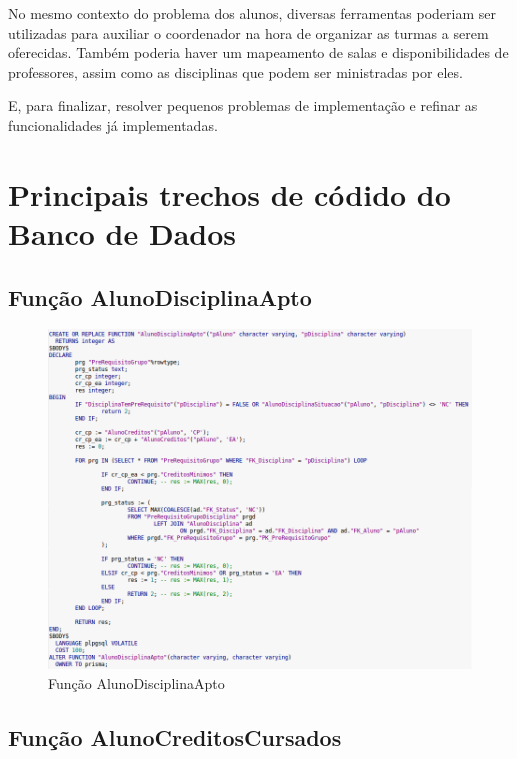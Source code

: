 \documentclass[graduacao,brazil]{ThesisPUC}
\begin{document}
No mesmo contexto do problema dos alunos, diversas ferramentas poderiam ser utilizadas para auxiliar o coordenador na hora de organizar as turmas a serem oferecidas. Também poderia haver um mapeamento de salas e disponibilidades de professores, assim como as disciplinas que podem ser ministradas por eles.

E, para finalizar, resolver pequenos problemas de implementação e refinar as funcionalidades já implementadas.

\arial
\nocite{*}


\normalfont

\appendix

\chapter{Principais trechos de códido do Banco de Dados}

\section{Função AlunoDisciplinaApto}

\begin{figure}[H]
    \centering
    \includegraphics[width=\linewidth]{img/v3_func_alunoapto.png}
    \caption{Função AlunoDisciplinaApto}
\end{figure}

\section{Função AlunoCreditosCursados}
\end{document}
